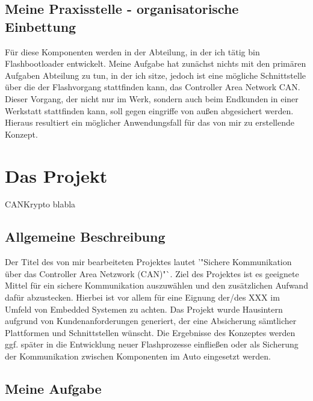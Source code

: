 
\subsection{Meine Praxisstelle - organisatorische Einbettung} %



Für diese Komponenten werden in der Abteilung, in der ich tätig bin Flashbootloader entwickelt. 
Meine Aufgabe hat zunächst nichts mit den primären Aufgaben Abteilung zu tun, in der ich sitze, jedoch ist eine mögliche Schnittstelle über die der Flashvorgang stattfinden kann, das Controller Area Network CAN. Dieser Vorgang, der nicht nur im Werk, sondern auch beim Endkunden in einer Werkstatt stattfinden kann, soll gegen eingriffe von außen abgesichert werden. Hieraus resultiert ein möglicher Anwendungsfall für das von mir zu erstellende Konzept. 

\section{Das Projekt}
CANKrypto blabla
\subsection{Allgemeine Beschreibung}

Der Titel des von mir bearbeiteten Projektes lautet '"Sichere Kommunikation über das Controller Area Netzwork (CAN)"`. 
Ziel des Projektes ist es geeignete Mittel für ein sichere Kommunikation auszuwählen und den zusätzlichen Aufwand dafür abzustecken. Hierbei ist vor allem für eine Eignung der/des XXX im Umfeld von Embedded Systemen zu achten. 
Das Projekt wurde Hausintern aufgrund von Kundenanforderungen generiert, der eine Absicherung sämtlicher Plattformen und Schnittstellen wünscht.
Die Ergebnisse des Konzeptes werden ggf. später in die Entwicklung neuer Flashprozesse einfließen oder als Sicherung der Kommunikation zwischen Komponenten im Auto eingesetzt werden.
\subsection{Meine Aufgabe} %

